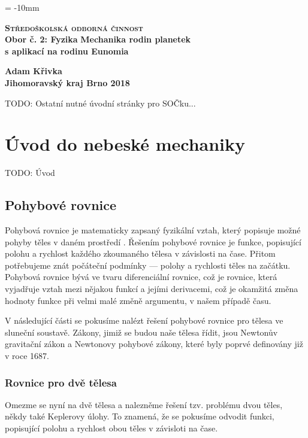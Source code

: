\documentclass[A4paper, 12pt, oneside]{book}
\newcommand{\B}[1]{\textbf{#1}}
\renewcommand{\S}[1]{\textsc{#1}}
\begin{document}
\voffset = -10mm
\begin{center}
	{\LARGE \B{\S{Středoškolská odborná činnost}}} \\
	{\large \B{{Obor č. 2: Fyzika}}}
	\vfill
	{\Huge \B{Mechanika rodin planetek \\ s aplikací na rodinu Eunomia}}
\end{center}
	\vfill
{\large \bfseries Adam Křivka \\
	Jihomoravský kraj \hfill Brno 2018}

\newpage

TODO: Ostatní nutné úvodní stránky pro SOČku...

\newpage
\tableofcontents
\newpage

\chapter{Úvod do nebeské mechaniky}
TODO: Úvod
\vspace{40mm}
\section{Pohybové rovnice}
Pohybová rovnice je matematicky zapsaný fyzikální vztah, který popisuje možné pohyby těles v daném prostředí \cite{wiki:eqm}. Řešením pohybové rovnice je funkce, popisující polohu a rychlost každého zkoumaného tělesa v závislosti na čase. Přitom potřebujeme znát počáteční podmínky --- polohy a rychlosti těles na začátku. Pohybová rovnice bývá ve tvaru diferenciální rovnice, což je rovnice, která vyjadřuje vztah mezi nějakou funkcí a jejími derivacemi, což je okamžitá změna hodnoty funkce při velmi malé změně argumentu, v našem případě času. 

V následující části se pokusíme nalézt řešení pohybové rovnice pro tělesa ve sluneční soustavě. Zákony, jimiž se budou naše tělesa řídit, jsou Newtonův gravitační zákon a Newtonovy pohybové zákony, které byly poprvé definovány již v roce 1687.
\subsection{Rovnice pro dvě tělesa}
Omezme se nyní na dvě tělesa a nalezněme řešení tzv. problému dvou těles, někdy také Keplerovy úlohy. To znamená, že se pokusíme odvodit funkci, popisující polohu a rychlost obou těles v závisloti na čase. 
\end{document}
